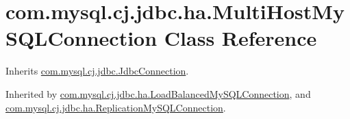\hypertarget{classcom_1_1mysql_1_1cj_1_1jdbc_1_1ha_1_1_multi_host_my_s_q_l_connection}{}\section{com.\+mysql.\+cj.\+jdbc.\+ha.\+Multi\+Host\+My\+S\+Q\+L\+Connection Class Reference}
\label{classcom_1_1mysql_1_1cj_1_1jdbc_1_1ha_1_1_multi_host_my_s_q_l_connection}


Inherits \mbox{\hyperlink{interfacecom_1_1mysql_1_1cj_1_1jdbc_1_1_jdbc_connection}{com.\+mysql.\+cj.\+jdbc.\+Jdbc\+Connection}}.



Inherited by \mbox{\hyperlink{classcom_1_1mysql_1_1cj_1_1jdbc_1_1ha_1_1_load_balanced_my_s_q_l_connection}{com.\+mysql.\+cj.\+jdbc.\+ha.\+Load\+Balanced\+My\+S\+Q\+L\+Connection}}, and \mbox{\hyperlink{classcom_1_1mysql_1_1cj_1_1jdbc_1_1ha_1_1_replication_my_s_q_l_connection}{com.\+mysql.\+cj.\+jdbc.\+ha.\+Replication\+My\+S\+Q\+L\+Connection}}.


